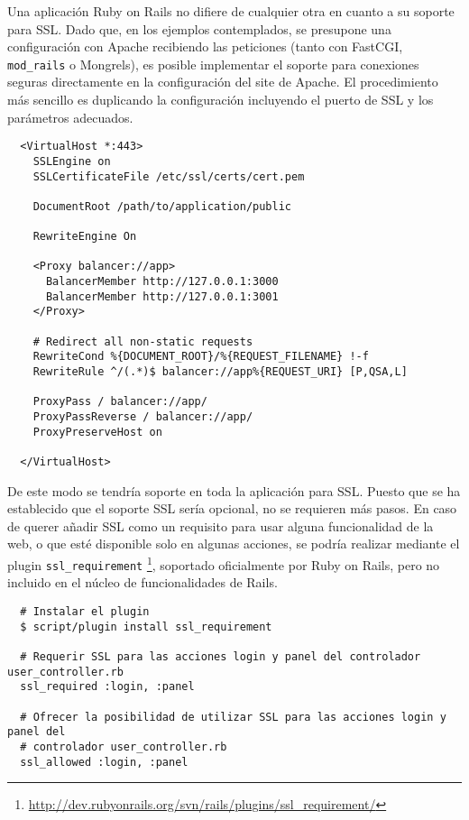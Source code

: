 Una aplicación Ruby on Rails no difiere de cualquier otra en cuanto a su soporte para SSL. Dado que, en los ejemplos contemplados, se presupone una configuración con Apache recibiendo las peticiones (tanto con FastCGI, \texttt{mod\_rails} o Mongrels), es posible implementar el soporte para conexiones seguras directamente en la configuración del site de Apache. El procedimiento más sencillo es duplicando la configuración incluyendo el puerto de SSL y los parámetros adecuados.

\begin{verbatim}
  <VirtualHost *:443>
    SSLEngine on
    SSLCertificateFile /etc/ssl/certs/cert.pem

    DocumentRoot /path/to/application/public

    RewriteEngine On

    <Proxy balancer://app>
      BalancerMember http://127.0.0.1:3000
      BalancerMember http://127.0.0.1:3001
    </Proxy>
    
    # Redirect all non-static requests
    RewriteCond %{DOCUMENT_ROOT}/%{REQUEST_FILENAME} !-f
    RewriteRule ^/(.*)$ balancer://app%{REQUEST_URI} [P,QSA,L]

    ProxyPass / balancer://app/
    ProxyPassReverse / balancer://app/
    ProxyPreserveHost on

  </VirtualHost>
\end{verbatim}

De este modo se tendría soporte en toda la aplicación para SSL. Puesto que se ha establecido que el soporte SSL sería opcional, no se requieren más pasos. En caso de querer añadir SSL como un requisito para usar alguna funcionalidad de la web, o que esté disponible solo en algunas acciones, se podría realizar mediante el plugin \texttt{ssl\_requirement} \footnote{\url{http://dev.rubyonrails.org/svn/rails/plugins/ssl\_requirement/}}, soportado oficialmente por Ruby on Rails, pero no incluido en el núcleo de funcionalidades de Rails.

\begin{verbatim}
  # Instalar el plugin
  $ script/plugin install ssl_requirement
  
  # Requerir SSL para las acciones login y panel del controlador user_controller.rb
  ssl_required :login, :panel
  
  # Ofrecer la posibilidad de utilizar SSL para las acciones login y panel del
  # controlador user_controller.rb
  ssl_allowed :login, :panel
\end{verbatim}











